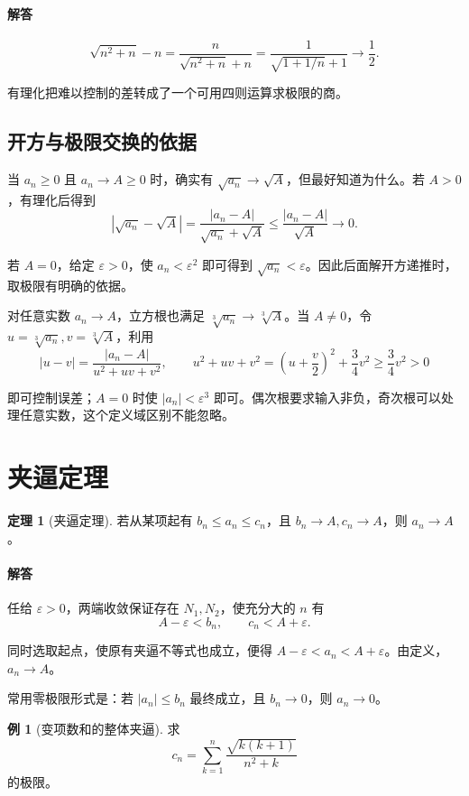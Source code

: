 \documentclass[UTF8,fontset=fandol,12pt,oneside,openany]{ctexrep}
\theoremstyle{definition}
\newtheorem{theorem}{定理}[chapter]
\newtheorem{example}{例}[chapter]
\begin{document}
\paragraph{解答}
\[
\sqrt{n^2+n}-n
=\frac{n}{\sqrt{n^2+n}+n}
=\frac1{\sqrt{1+1/n}+1}\to\frac12.
\]

有理化把难以控制的差转成了一个可用四则运算求极限的商。

\subsection*{开方与极限交换的依据}

当 $a_n\ge0$ 且 $a_n\to A\ge0$ 时，确实有 $\sqrt{a_n}\to\sqrt A$，但最好知道为什么。若 $A>0$，有理化后得到
\[
|\sqrt{a_n}-\sqrt A|
=\frac{|a_n-A|}{\sqrt{a_n}+\sqrt A}
\le\frac{|a_n-A|}{\sqrt A}\to0.
\]

若 $A=0$，给定 $\varepsilon>0$，使 $a_n<\varepsilon^2$ 即可得到 $\sqrt{a_n}<\varepsilon$。因此后面解开方递推时，取极限有明确的依据。

对任意实数 $a_n\to A$，立方根也满足 $\sqrt[3]{a_n}\to\sqrt[3]A$。当 $A\ne0$，令 $u=\sqrt[3]{a_n},v=\sqrt[3]A$，利用
\[
|u-v|=\frac{|a_n-A|}{u^2+uv+v^2},\qquad
u^2+uv+v^2=\left(u+\frac v2\right)^2+\frac34v^2\ge\frac34v^2>0
\]

即可控制误差；$A=0$ 时使 $|a_n|<\varepsilon^3$ 即可。偶次根要求输入非负，奇次根可以处理任意实数，这个定义域区别不能忽略。

\section{夹逼定理}

\begin{theorem}[夹逼定理]
若从某项起有 $b_n\le a_n\le c_n$，且 $b_n\to A,c_n\to A$，则 $a_n\to A$。
\end{theorem}

\paragraph{解答} 任给 $\varepsilon>0$，两端收敛保证存在 $N_1,N_2$，使充分大的 $n$ 有
\[
A-\varepsilon<b_n,\qquad c_n<A+\varepsilon.
\]

同时选取起点，使原有夹逼不等式也成立，便得 $A-\varepsilon<a_n<A+\varepsilon$。由定义，$a_n\to A$。

常用零极限形式是：若 $|a_n|\le b_n$ 最终成立，且 $b_n\to0$，则 $a_n\to0$。

\begin{example}[变项数和的整体夹逼]
求
\[
c_n=\sum_{k=1}^n\frac{\sqrt{k(k+1)}}{n^2+k}
\]
的极限。
\end{example}
\end{document}
